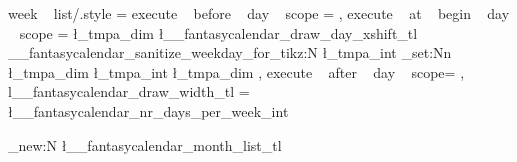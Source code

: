 
\tikzset
  {
    week ~ list/.style = 
      {
        execute ~ before ~ day ~ scope =
          {
              {
                  { 
                    \pgftransformyshift{-\pgf@y}
                  } 
              }
          }
        ,
        execute ~ at ~ begin ~ day ~ scope =
          {
            \pgfmathsetlength \l_tmpa_dim { \l__fantasycalendar_draw_day_xshift_tl}
            \__fantasycalendar_sanitize_weekday_for_tikz:N \l_tmpa_int
            \dim_set:Nn \l_tmpa_dim { \l_tmpa_int \l_tmpa_dim }
          }
        ,
        execute ~ after ~ day ~ scope=
          {
              {
              }
          }
        ,
        l__fantasycalendar_draw_width_tl = \l__fantasycalendar_nr_days_per_week_int
      }    
  }
    
    
    

%

\tl_new:N \l__fantasycalendar_month_list_tl

